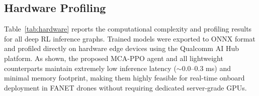 \begin{table}[h]
    \centering
    \caption{Fading-Model Sensitivity: Mean Throughput (Mbps) over five seeds.}
    \label{tab:fading}
\end{table}

\subsection{Hardware Profiling}

Table~\ref{tab:hardware} reports the computational complexity and profiling results for all deep RL inference graphs. Trained models were exported to ONNX format and profiled directly on hardware edge devices using the Qualcomm AI Hub platform. As shown, the proposed MCA-PPO agent and all lightweight counterparts maintain extremely low inference latency ($\sim$0.0--0.3 ms) and minimal memory footprint, making them highly feasible for real-time onboard deployment in FANET drones without requiring dedicated server-grade GPUs.

